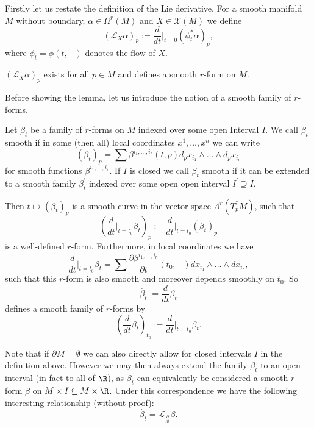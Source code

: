 Firstly let us restate the definition of the Lie derivative. For a smooth manifold $M$ without boundary, $\alpha \in \Omega^r(M)$ and $X \in \mathscr{X}(M)$ we define
\[
(\mathcal{L}_X \alpha)_p := \frac{d}{dt}\bigg|_{t=0} (\phi_t^\ast \alpha)_p,
\]
where $\phi_t = \phi(t,-)$ denotes the flow of $X$.

\begin{lemma}
    \label{lem:well_definedness_Lie_derivative}
    $(\mathcal{L}_X\alpha)_p$ exists for all $p\in M$ and defines a smooth $r$-form on $M$.
\end{lemma}

Before showing the lemma, let us introduce the notion of a smooth family of $r$-forms.

\begin{definition}
    Let $\beta_t$ be a family of $r$-forms on $M$ indexed over some open Interval $I$. We call $\beta_t$ smooth if in some (then all) local coordinates $x^1,\ldots,x^n$ we can write
    \[
    (\beta_t)_p = \sum \beta^{i_1,\ldots,i_r}(t,p)d_px_{i_1} \wedge \ldots \wedge d_px_{i_r}
    \]
    for smooth functions $\beta^{i_1,\ldots,i_r}$. If $I$ is closed we call $\beta_t$ smooth if it can be extended to a smooth family $\beta^\prime_t$ indexed over some open open interval $I^\prime \supseteq I$.
\end{definition}

\noindent Then $t \mapsto (\beta_t)_p$ is a smooth curve in the vector space $\Lambda^r(T_p^\ast M)$, such that 
\[
\left(\frac{d}{dt}\bigg|_{t=t_0} \beta_t\right)_p := \frac{d}{dt}\bigg|_{t=t_0} (\beta_t)_p
\]
is a well-defined $r$-form. Furthermore, in local coordinates we have
\[
    \frac{d}{dt}\bigg|_{t=t_0} \beta_t = \sum \frac{\partial\beta^{i_1,\ldots,i_r}}{\partial t}(t_0,-)dx_{i_1} \wedge \ldots \wedge dx_{i_r},
\]
such that this $r$-form is also smooth and moreover depends smoothly on $t_0$. So 
\[
\dot{\beta_t} := \frac{d}{dt}\beta_t
\]
defines a smooth family of $r$-forms by
\[
\left(\frac{d}{dt}\beta_t\right)_{t_0} := \frac{d}{dt}\bigg|_{t=t_0} \beta_t.
\]

Note that if $\partial M = \emptyset$ we can also directly allow for closed intervals $I$ in the definition above. However we may then always extend the family $\beta_t$ to an open interval (in fact to all of $\R$), as $\beta_t$ can equivalently be considered a smooth $r$-form $\beta$ on $M \times I \subseteq M \times \R$. Under this correspondence we have the following interesting relationship (without proof):
\[
\dot{\beta_t} = \mathcal{L}_{\frac{\partial}{\partial t}}\beta.
\]


